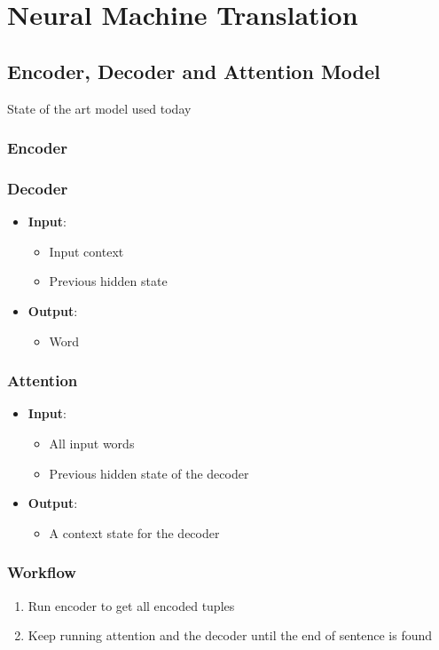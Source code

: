 \chapter{Neural Machine Translation}

\section{Encoder, Decoder and Attention Model}

  State of the art model used today

  \subsection{Encoder}


  \subsection{Decoder}

    \begin{itemize}
      \item \textbf{Input}:
      \begin{itemize}
        \item Input context
        \item Previous hidden state
      \end{itemize}

      \item \textbf{Output}:
      \begin{itemize}
        \item Word
      \end{itemize}
    \end{itemize}

  \subsection{Attention}

    \begin{itemize}
      \item \textbf{Input}:
      \begin{itemize}
        \item All input words
        \item Previous hidden state of the decoder
      \end{itemize}

      \item \textbf{Output}:
      \begin{itemize}
        \item A context state for the decoder
      \end{itemize}
    \end{itemize}

  \subsection{Workflow}

    \begin{enumerate}
      \item Run encoder to get all encoded tuples
      \item Keep running attention and the decoder until the end of sentence is
      found
    \end{enumerate}
